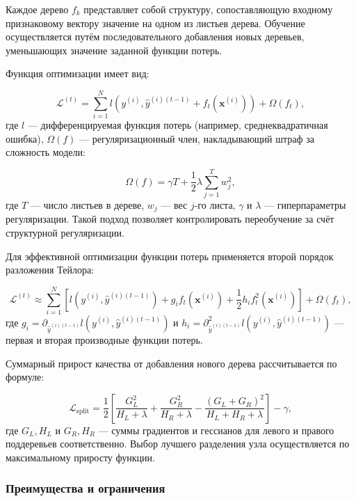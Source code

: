 Каждое дерево $f_k$ представляет собой структуру, сопоставляющую входному признаковому вектору значение на одном из листьев дерева. Обучение осуществляется путём последовательного добавления новых деревьев, уменьшающих значение заданной функции потерь.

Функция оптимизации имеет вид:

\begin{equation}
\mathcal{L}^{(t)} = \sum_{i=1}^N l\left(y^{(i)}, \hat{y}^{(i)(t-1)} + f_t(\mathbf{x}^{(i)})\right) + \Omega(f_t),
\end{equation}
где $l$ — дифференцируемая функция потерь (например, среднеквадратичная ошибка), $\Omega(f)$ — регуляризационный член, накладывающий штраф за сложность модели:

\begin{equation}
\Omega(f) = \gamma T + \frac{1}{2} \lambda \sum_{j=1}^{T} w_j^2,
\end{equation}
где $T$ — число листьев в дереве, $w_j$ — вес $j$-го листа, $\gamma$ и $\lambda$ — гиперпараметры регуляризации. Такой подход позволяет контролировать переобучение за счёт структурной регуляризации.

Для эффективной оптимизации функции потерь применяется второй порядок разложения Тейлора:

\begin{equation}
\mathcal{L}^{(t)} \approx \sum_{i=1}^N \left[ l(y^{(i)}, \hat{y}^{(i)(t-1)}) + g_i f_t(\mathbf{x}^{(i)}) + \frac{1}{2} h_i f_t^2(\mathbf{x}^{(i)}) \right] + \Omega(f_t),
\end{equation}
где $g_i = \partial_{\hat{y}^{(i)(t-1)}} l(y^{(i)}, \hat{y}^{(i)(t-1)})$ и $h_i = \partial^2_{\hat{y}^{(i)(t-1)}} l(y^{(i)}, \hat{y}^{(i)(t-1)})$ — первая и вторая производные функции потерь.

Суммарный прирост качества от добавления нового дерева рассчитывается по формуле:

\begin{equation}
\mathcal{L}_{\text{split}} = \frac{1}{2} \left[ \frac{G_L^2}{H_L + \lambda} + \frac{G_R^2}{H_R + \lambda} - \frac{(G_L + G_R)^2}{H_L + H_R + \lambda} \right] - \gamma,
\end{equation}
где $G_L, H_L$ и $G_R, H_R$ — суммы градиентов и гессианов для левого и правого поддеревьев соответственно. Выбор лучшего разделения узла осуществляется по максимальному приросту функции.

\subsubsection{Преимущества и ограничения}

